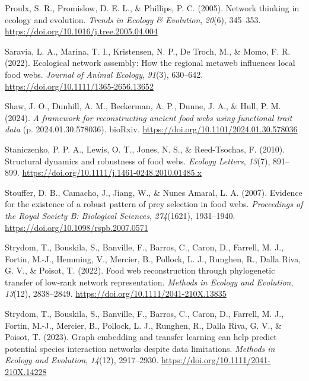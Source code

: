 \documentclass[
]{article}
\newlength{\cslhangindent}
\newenvironment{CSLReferences}[2] %
 {\begin{list}{}{%
  \setlength{\itemindent}{0pt}
  \setlength{\leftmargin}{0pt}
  \setlength{\parsep}{0pt}
  \ifodd #1
   \setlength{\leftmargin}{\cslhangindent}
   \setlength{\itemindent}{-1\cslhangindent}
  \fi
  \setlength{\itemsep}{#2\baselineskip}}}
 {\end{list}}
\begin{document}
\begin{CSLReferences}{1}{0}
Proulx, S. R., Promislow, D. E. L., \& Phillips, P. C. (2005). Network
thinking in ecology and evolution. \emph{Trends in Ecology \&
Evolution}, \emph{20}(6), 345--353.
\url{https://doi.org/10.1016/j.tree.2005.04.004}

Saravia, L. A., Marina, T. I., Kristensen, N. P., De Troch, M., \& Momo,
F. R. (2022). Ecological network assembly: {How} the regional metaweb
influences local food webs. \emph{Journal of Animal Ecology},
\emph{91}(3), 630--642. \url{https://doi.org/10.1111/1365-2656.13652}

Shaw, J. O., Dunhill, A. M., Beckerman, A. P., Dunne, J. A., \& Hull, P.
M. (2024). \emph{A framework for reconstructing ancient food webs using
functional trait data} (p. 2024.01.30.578036). bioRxiv.
\url{https://doi.org/10.1101/2024.01.30.578036}

Staniczenko, P. P. A., Lewis, O. T., Jones, N. S., \& Reed-Tsochas, F.
(2010). Structural dynamics and robustness of food webs. \emph{Ecology
Letters}, \emph{13}(7), 891--899.
\url{https://doi.org/10.1111/j.1461-0248.2010.01485.x}

Stouffer, D. B., Camacho, J., Jiang, W., \& Nunes Amaral, L. A. (2007).
Evidence for the existence of a robust pattern of prey selection in food
webs. \emph{Proceedings of the Royal Society B: Biological Sciences},
\emph{274}(1621), 1931--1940.
\url{https://doi.org/10.1098/rspb.2007.0571}

Strydom, T., Bouskila, S., Banville, F., Barros, C., Caron, D., Farrell,
M. J., Fortin, M.-J., Hemming, V., Mercier, B., Pollock, L. J., Runghen,
R., Dalla Riva, G. V., \& Poisot, T. (2022). Food web reconstruction
through phylogenetic transfer of low-rank network representation.
\emph{Methods in Ecology and Evolution}, \emph{13}(12), 2838--2849.
\url{https://doi.org/10.1111/2041-210X.13835}

Strydom, T., Bouskila, S., Banville, F., Barros, C., Caron, D., Farrell,
M. J., Fortin, M.-J., Mercier, B., Pollock, L. J., Runghen, R., Dalla
Riva, G. V., \& Poisot, T. (2023). Graph embedding and transfer learning
can help predict potential species interaction networks despite data
limitations. \emph{Methods in Ecology and Evolution}, \emph{14}(12),
2917--2930. \url{https://doi.org/10.1111/2041-210X.14228}


\end{CSLReferences}
\end{document}

